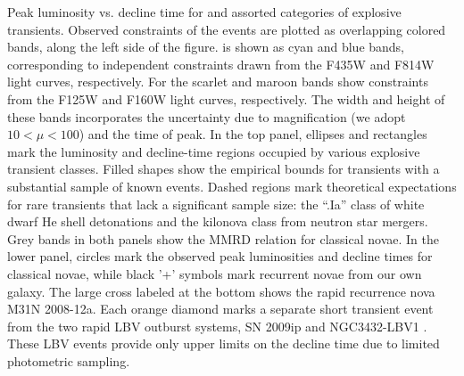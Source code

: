 \label{fig:PeakLuminosityDeclineTime}
Peak luminosity vs. decline time for \spock and assorted categories of
explosive transients.  Observed constraints of the \spock events are
plotted as overlapping colored bands, along the left side of the
figure.  \spockone is shown as cyan and blue bands, corresponding to
independent constraints drawn from the F435W and F814W light curves,
respectively.  For \spocktwo the scarlet and maroon bands show
constraints from the F125W and F160W light curves, respectively.  The
width and height of these bands incorporates the uncertainty due to
magnification (we adopt $10<\mu<100$) and the time of peak.  In
the top panel, ellipses and rectangles mark the luminosity and
decline-time regions occupied by various explosive transient classes.
Filled shapes show the empirical bounds for transients with a
substantial sample of known events. Dashed regions mark theoretical
expectations for rare transients that lack a significant sample size:
the ``.Ia'' class of white dwarf He shell detonations and the kilonova
class from neutron star mergers.  Grey bands in both panels show the
MMRD relation for classical novae.  In the lower panel, circles mark
the observed peak luminosities and decline times for classical novae,
while black '+' symbols mark recurrent novae from our own galaxy.  The
large cross labeled at the bottom shows the rapid recurrence nova M31N
2008-12a.  Each orange diamond marks a separate short transient event
from the two rapid LBV outburst systems, SN
2009ip \citep{Pastorello:2013} and NGC3432-LBV1 \citep[a.k.a. SN
2000ch][]{Pastorello:2010}.  These LBV events provide only upper
limits on the decline time due to limited photometric sampling.
